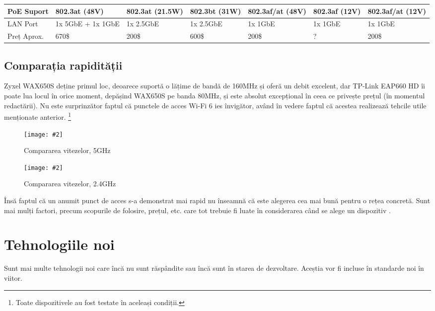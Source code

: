 \documentclass[a4paper,12pt]{report}
\def\oldchapter{} \let\oldchapter=\chapter{}
\def\chapter{\stepcounter{num_chapters}\oldchapter}
\newcommand{\centeredImageWithCaption}[2]{%
  \begin{figure}[H]
    \caption{#1}
    \texttt{[image: \#2]}
    \centering
  \end{figure}}
\begin{document}
\begin{table}[!ht]
\begin{tabular}{|p{}*{6}{|p{0.11\textwidth}}|}
      \hline
      PoE Suport &
      802.3at (48V) &
      802.3at (21.5W) &
      802.3bt (31W) &
      802.3af/at (48V) &
      802.3af (12V) &
      802.3af/at (12V) \\

      \hline
      LAN Port &
      1x 5GbE + 1x 1GbE &
      1x 2.5GbE &
      1x 2.5GbE &
      1x 1GbE &
      1x 1GbE &
      1x 1GbE \\

      \hline
      Preț Aprox. &
      670\$ &
      200\$ &
      600\$ &
      200\$ &
      {?} &
      200\$ \\

      \hline
  \end{tabular}
\end{table}



\section{Comparația rapidității}

\cite{standards_ieee802_11_timeline}

Zyxel WAX650S deține primul loc, deoarece suportă o lățime de bandă de 160MHz și oferă un debit excelent, dar TP-Link E\ac{AP}660 HD îi poate lua locul în orice moment, depășind WAX650S pe banda 80MHz, și este absolut excepțional în ceea ce privește prețul (în momentul redactării).
Nu este surprinzător faptul că punctele de acces \ac{Wi-Fi} 6 ies învigător, având în vedere faptul că acestea realizează tehcile utile menționate anterior. \footnote{Toate dispozitivele au fost testate în aceleași condiții.}

\centeredImageWithCaption{Compararea vitezelor, 5GHz}{best-wireless-access-points-1-re-new.jpg}

\centeredImageWithCaption{Compararea vitezelor, 2.4GHz}{best-wireless-access-points-2-re-new.jpg}


Însă faptul că un anumit punct de acces s-a demonstrat mai rapid nu înseamnă că este alegerea cea mai bună pentru o rețea concretă. Sunt mai mulți factori, precum scopurile de folosire, prețul, etc. care tot trebuie fi luate în considerarea când se alege un dispozitiv \cite{AP_comparison}.


\chapter{Tehnologiile noi}

Sunt mai multe tehnologii noi care încă nu sunt răspândite sau încă sunt în starea de dezvoltare.
Aceștia vor fi incluse în standarde noi în viitor.
\end{document}
